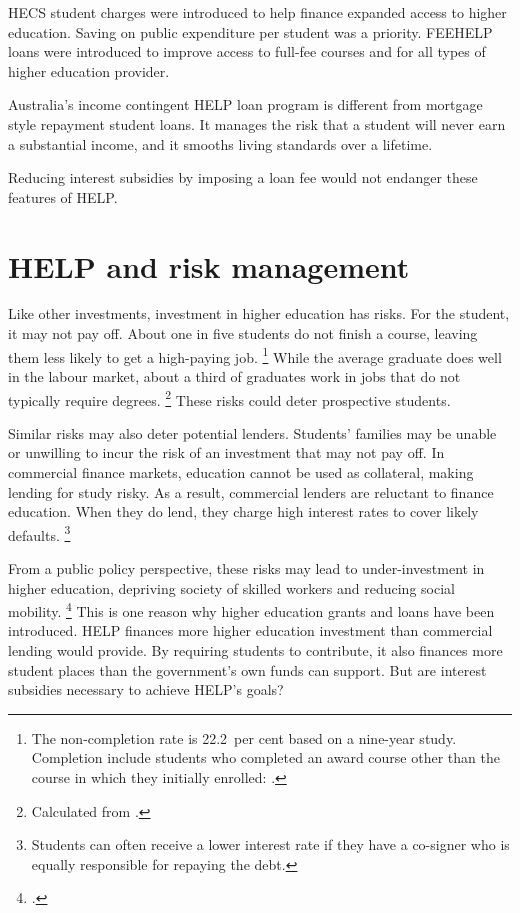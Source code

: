 \documentclass[embargoed]{grattan}
\begin{document}
\gls{HECS} student charges were introduced to help finance expanded access to higher education.
Saving on public expenditure per student was a priority.
\gls{FEEHELP} loans were introduced to improve access to full-fee courses and for all types of higher education provider.

Australia's income contingent \gls{HELP} loan program is different from mortgage style repayment student loans. It manages the risk that a student will never earn a substantial income, and it smooths living standards over a lifetime.

Reducing interest subsidies by imposing a loan fee would not endanger these features of \gls{HELP}\@.

\section[HELP and risk management]{\gls{HELP} and risk management}\label{help-and-risk-management}

Like other investments, investment in higher education has risks.
For the student, it may not pay off.
About one in five students do not finish a course, leaving them less likely to get a high-paying job.%
\footnote{The non-completion rate is 22.2~per cent based on a nine-year study.
Completion include students who completed an award course other than the course in which they initially enrolled: \textcite{Education2015Completionratesdomestic}.} 
While the average graduate does well in the labour market, about a third of graduates work in jobs that do not typically require degrees.%
\footnote{Calculated from \textcite[][Table~10]{ABS2015Educationwork2015}.} 
These risks could deter prospective students.

Similar risks may also deter potential lenders.
Students' families may be unable or unwilling to incur the risk of an investment that may not pay off.
In commercial finance markets, education cannot be used as collateral, making lending for study risky.
As a result, commercial lenders are reluctant to finance education.
When they do lend, they charge high interest rates to cover likely defaults.%
\footnote{Students can often receive a lower interest rate if they have a co-signer who is equally responsible for repaying the debt.}

From a public policy perspective, these risks may lead to under-investment in higher education, depriving society of skilled workers and reducing social mobility.%
\footcite[][Section~2.5]{Chapman2006Governmentmanagingrisk} 
This is one reason why higher education grants and loans have been introduced.
\gls{HELP} finances more higher education investment than commercial lending would provide.
By requiring students to contribute, it also finances more student places than the government's own funds can support.
But are interest subsidies necessary to achieve \gls{HELP}'s goals?
\end{document}
